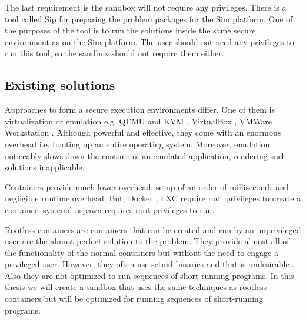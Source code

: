 \documentclass[en]{pracamgr}
\begin{document}
The last requirement is the sandbox will not require any privileges. There is a tool called Sip \cite{sip} for preparing the problem packages for the Sim platform. One of the purposes of the tool is to run the solutions inside the same secure environment as on the Sim platform. The user should not need any privileges to run this tool, so the sandbox should not require them either.

\subsection{Existing solutions}

Approaches to form a secure execution environments differ. One of them is virtualization or emulation e.g. QEMU \cite{qemu_website} and KVM \cite{kvm_website}, VirtualBox \cite{virtualbox_website}, VMWare Workstation \cite{vmware_workstation_website}. Although powerful and effective, they come with an enormous overhead i.e. booting up an entire operating system. Moreover, emulation noticeably slows down the runtime of an emulated application, rendering such solutions inapplicable.

Containers provide much lower overhead: setup of an order of milliseconds and negligible runtime overhead. But, Docker \cite{Merkel:2014:DLL:2600239.2600241}, LXC \cite{conf/cisis/BeserraMEBSF15} require root privileges to create a container. systemd-nspawn \cite{systemd_nspawn} requires root privileges to run.

Rootless containers are containers \cite{rootless_containers_rs} that can be created and run by an unprivileged user are the almost perfect solution to the problem. They provide almost all of the functionality of the normal containers but without the need to engage a privileged user. However, they often use setuid binaries and that is undesirable \cite{podman_rootless_containers_presentation}. Also they are not optimized to run sequences of short-running programs. In this thesis we will create a sandbox that uses the same techniques as rootless containers but will be optimized for running sequences of short-running programs.


\end{document}
